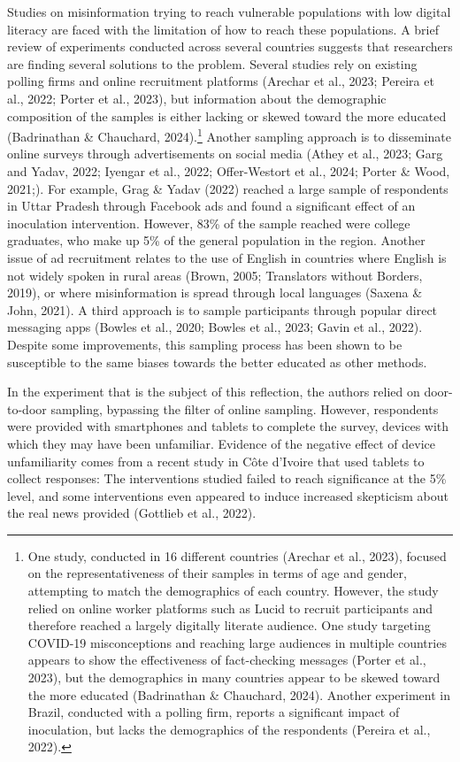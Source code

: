 \documentclass[authordate, reflection, issue]{jote-new-article}
\begin{document}
	Studies on misinformation trying to reach vulnerable populations with low digital literacy are faced with the limitation of how to reach these populations. A brief review of experiments conducted across several countries suggests that researchers are finding several solutions to the problem. Several studies rely on existing polling firms and online recruitment platforms (Arechar et al., 2023; Pereira et al., 2022; Porter et al., 2023), but information about the demographic composition of the samples is either lacking or skewed toward the more educated (Badrinathan \& Chauchard, 2024).\footnote{ One study, conducted in 16 different countries (Arechar et al., 2023), focused on the representativeness of their samples in terms of age and gender, attempting to match the demographics of each country. However, the study relied on online worker platforms such as Lucid to recruit participants and therefore reached a largely digitally literate audience. One study targeting COVID-19 misconceptions and reaching large audiences in multiple countries appears to show the effectiveness of fact-checking messages (Porter et al., 2023), but the demographics in many countries appear to be skewed toward the more educated (Badrinathan \& Chauchard, 2024). Another experiment in Brazil, conducted with a polling firm, reports a significant impact of inoculation, but lacks the demographics of the respondents (Pereira et al., 2022).} Another sampling approach is to disseminate online surveys through advertisements on social media (Athey et al., 2023; Garg and Yadav, 2022; Iyengar et al., 2022; Offer-Westort et al., 2024; Porter \& Wood, 2021;). For example, Grag \& Yadav (2022) reached a large sample of respondents in Uttar Pradesh through Facebook ads and found a significant effect of an inoculation intervention. However, 83\% of the sample reached were college graduates, who make up 5\% of the general population in the region. Another issue of ad recruitment relates to the use of English in countries where English is not widely spoken in rural areas (Brown, 2005; Translators without Borders, 2019), or where misinformation is spread through local languages (Saxena \& John, 2021). A third approach is to sample participants through popular direct messaging apps (Bowles et al., 2020; Bowles et al., 2023; Gavin et al., 2022). Despite some improvements, this sampling process has been shown to be susceptible to the same biases towards the better educated as other methods.



	In the experiment that is the subject of this reflection, the authors relied on door-to-door sampling, bypassing the filter of online sampling. However, respondents were provided with smartphones and tablets to complete the survey, devices with which they may have been unfamiliar. Evidence of the negative effect of device unfamiliarity comes from a recent study in Côte d'Ivoire that used tablets to collect responses: The interventions studied failed to reach significance at the 5\% level, and some interventions even appeared to induce increased skepticism about the real news provided (Gottlieb et al., 2022).
\end{document}
